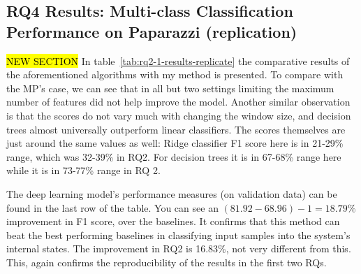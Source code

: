 \subsection{RQ4 Results: Multi-class Classification Performance on Paparazzi (replication)}
\hl{NEW SECTION}
In table~\ref{tab:rq2-1-results-replicate} the comparative results of the aforementioned algorithms with my method is presented. 
To compare with the MP's case, we can see that in all but two settings limiting the maximum number of features did not help improve the model. 
Another similar observation is that the scores do not vary much with changing the window size, and decision trees almost universally outperform linear classifiers.
The scores themselves are just around the same values as well: Ridge classifier F1 score here is in 21-29\% range, which was 32-39\% in RQ2. For decision trees it is in 67-68\% range here while it is in 73-77\% range in RQ 2. 

The deep learning model's performance measures (on validation data) can be found in the last row of the table. 
You can see an $(81.92-68.96)-1=18.79\%$ improvement in F1 score, over the baselines. It confirms that this method can beat the best performing baselines in classifying input samples into the system's internal states. The improvement in RQ2 is 16.83\%, not very different from this. This, again confirms the reproducibility of the results in the first two RQs.

